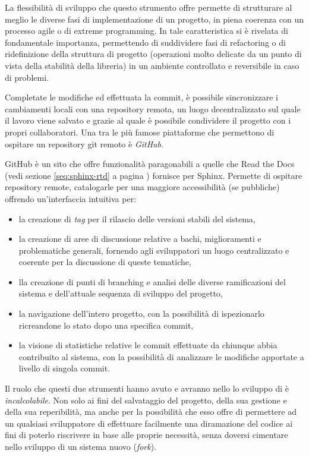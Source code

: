 La flessibilità di sviluppo che questo strumento offre permette di strutturare
al meglio le diverse fasi di implementazione di un progetto, in piena coerenza con
un processo agile o di extreme programming. In \pygfa tale caratteristica
si è rivelata di fondamentale importanza, permettendo di suddividere
fasi di refactoring o di ridefinizione della struttura di progetto (operazioni
molto delicate da un punto di vista della stabilità della libreria) in un
ambiente controllato e reversibile in caso di problemi.

Completate le modifiche ed effettuata la commit, è possibile sincronizzare
i cambiamenti locali con una repository remota, un luogo decentralizzato
sul quale il lavoro viene salvato e grazie al quale è possibile condividere
il progetto con i propri collaboratori. Una tra le più famose piattaforme
che permettono di ospitare un repository git remoto è \emph{GitHub}.

GitHub è un sito che offre funzionalità paragonabili a quelle che Read
the Docs (vedi sezione \ref{seq:sphinx-rtd} a pagina \pageref{seq:sphinx})
fornisce per Sphinx. Permette di ospitare repository remote, catalogarle
per una maggiore accessibilità (se pubbliche) offrendo un'interfaccia
intuitiva per:
\begin{itemize}
	\item la creazione di \emph{tag} per il rilascio delle versioni stabili del sistema,
	\item la creazione di aree di discussione relative a bachi, miglioramenti e problematiche
		generali, fornendo agli sviluppatori un luogo centralizzato e coerente
		per la discussione di queste tematiche,
	\item lla creazione di punti di branching e analisi delle diverse ramificazioni del sistema
		e dell'attuale sequenza di sviluppo del progetto,
	\item la navigazione dell'intero progetto, con la possibilità di ispezionarlo
		ricreandone lo stato dopo una specifica commit,
	\item la visione di statistiche relative le commit effettuate da chiunque
		abbia contribuito al sistema, con la possibilità di analizzare le modifiche
		apportate a livello di singola commit.
\end{itemize}

Il ruolo che questi due strumenti hanno avuto e avranno nello lo sviluppo
di \pygfa è \emph{incalcolabile}. Non solo ai fini del salvataggio del
progetto, della sua gestione e della sua reperibilità, ma anche per la
possibilità che esso offre di permettere ad un qualsiasi sviluppatore di
effettuare facilmente una diramazione del codice ai fini di poterlo
riscrivere in base alle proprie necessità, senza doversi cimentare
nello sviluppo di un sistema nuovo (\emph{fork}).

